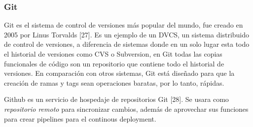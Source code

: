 \subsubsection{Git}
Git es el sistema de control de versiones más popular del mundo, fue creado en 2005 por Linus Torvalds [27]. Es un ejemplo de un DVCS, un sistema distribuido de control de versiones, a diferencia de sistemas donde en un solo lugar esta todo el historial de versiones como CVS o Subversion, en Git todas las copias funcionales de código son un repositorio que contiene todo el historial de versiones.
En comparación con otros sistemas, Git está diseñado para que la creación de ramas y tags sean operaciones baratas, por lo tanto, rápidas.

Github es un servicio de hospedaje de repositorios Git [28]. Se usara como \textit{repositorio remoto} para sincronizar cambios, además de aprovechar sus funciones para crear pipelines para el continous deployment.